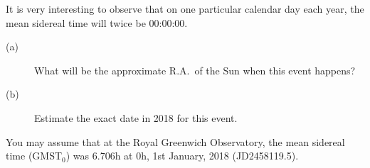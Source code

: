 It is very interesting to observe that on one particular calendar day each
year, the mean sidereal time will twice be 00:00:00.

\begin{description}
\item[(a)] What will be the approximate R.A.\ of the Sun when this event
  happens?
\item[(b)] Estimate the exact date in 2018 for this event.
\end{description}

You may assume that at the Royal Greenwich Observatory, the mean sidereal time
(GMST$_0$) was 6.706h at 0h, 1st January, 2018 (JD2458119.5).
